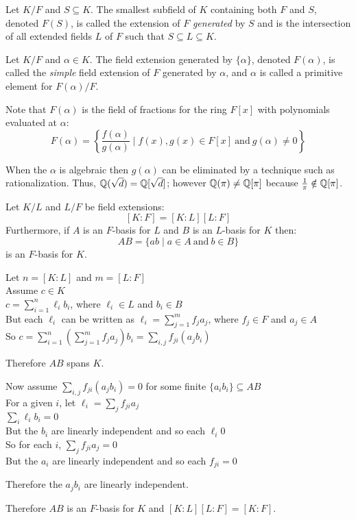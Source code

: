 \documentclass[letterpaper,12pt,fleqn]{article}
\renewcommand{\a}{\alpha}
\begin{document}
\begin{definition}
  Let $K/F$ and $S\subseteq K$. The smallest subfield of $K$ containing both
  $F$ and $S$, denoted $F(S)$, is called the extension of $F$ \emph{generated}
  by $S$ and is the intersection of all extended fields $L$ of $F$ such that
  $S\subseteq L\subseteq K$.
\end{definition}

\begin{definition}
  Let $K/F$ and $\a\in K$. The field extension generated by $\{\a\}$, denoted
  $F(\a)$, is called the \emph{simple} field extension of $F$ generated by $\a$,
  and $\a$ is called a primitive element for $F(\a)/F$.

  Note that $F(\a)$ is the field of fractions for the ring $F[x]$ with
  polynomials evaluated at $\a$:
  \[F(\a)=
  \left\{\frac{f(\a)}{g(\a)}\mid f(x),g(x)\in F[x]\ \mbox{and}\ g(\a)\ne 0
  \right\}\]

  When the $\a$ is algebraic then $g(\a)$ can be eliminated by a technique
  such as rationalization. Thus, $\mathbb{Q}(\sqrt{d})=\mathbb{Q}[\sqrt{d}]$; however
  $\mathbb{Q}(\pi)\ne\mathbb{Q}[\pi]$ because $\frac{1}{\pi}\notin\mathbb{Q}[\pi]$.
\end{definition}

\begin{theorem}
  Let $K/L$ and $L/F$ be field extensions:
  \[[K:F]=[K:L][L:F]\]
  Furthermore, if $A$ is an $F$-basis for $L$ and $B$ is an $L$-basis for $K$
  then:
  \[AB=\{ab\mid a\in A\ \mbox{and}\ b\in B\}\]
  is an $F$-basis for $K$.
\end{theorem}

\begin{theproof}
  Let $n=[K:L]$ and $m=[L:F]$ \\
  Assume $c\in K$ \\
  $c=\sum_{i=1}^n\ell_ib_i$, where $\ell_i\in L$ and $b_i\in B$ \\
  But each $\ell_i$ can be written as $\ell_i=\sum_{j=1}^mf_ja_j$, where
  $f_j\in F$ and $a_j\in A$ \\
  So $c=\sum_{i=1}^n\left(\sum_{j=1}^mf_ja_j\right)b_i=\sum_{i,j}f_{ji}(a_jb_i)$

  Therefore $AB$ spans $K$.

  Now assume $\sum_{i,j}f_{ji}(a_jb_i)=0$ for some finite
  $\{a_ib_i\}\subseteq AB$ \\
  For a given $i$, let $\ell_i=\sum_jf_{ji}a_j$ \\
  $\sum_{i}\ell_ib_i=0$ \\
  But the $b_i$ are linearly independent and so each $\ell_i0$ \\
  So for each $i$, $\sum_jf_{ji}a_j=0$ \\
  But the $a_i$ are linearly independent and so each $f_{ji}=0$

  Therefore the $a_jb_i$ are linearly independent.

  Therefore $AB$ is an $F$-basis for $K$ and $[K:L][L:F]=[K:F]$.
\end{theproof}
\end{document}
